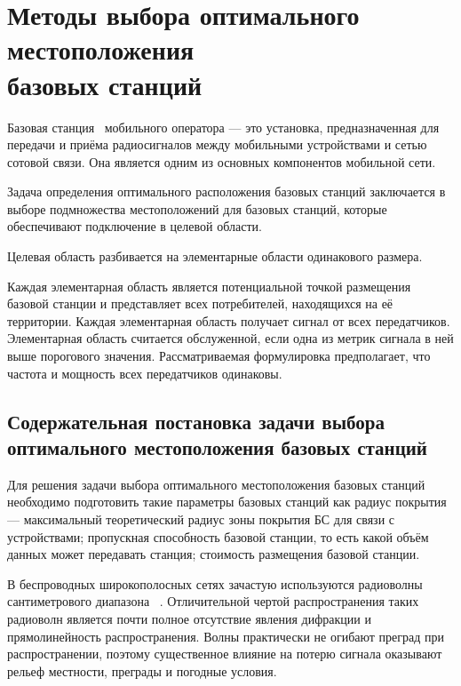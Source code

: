 
\chapter[Методы выбора оптимального местоположения базовых \\станций]{Методы выбора оптимального местоположения \\базовых станций}

Базовая станция~\cite{def-bs} мобильного оператора --- это установка, предназначенная для передачи и приёма радиосигналов между мобильными устройствами и сетью сотовой связи. Она является одним из основных компонентов мобильной сети.

Задача определения оптимального расположения базовых станций заключается в выборе подмножества местоположений для базовых станций, которые обеспечивают подключение в целевой области. 

Целевая область разбивается на элементарные области одинакового размера.

Каждая элементарная область является потенциальной точкой размещения базовой станции и представляет всех потребителей, находящихся на её территории. Каждая элементарная область получает сигнал от всех передатчиков. Элементарная область считается обслуженной, если одна из метрик сигнала в ней выше порогового значения. Рассматриваемая формулировка предполагает, что частота и мощность всех передатчиков одинаковы. 


\section[Содержательная постановка задачи выбора оптимального\\ местоположения базовых станций]{Содержательная постановка задачи выбора\\ оптимального местоположения базовых станций}

Для решения задачи выбора оптимального местоположения базовых станций необходимо подготовить такие параметры базовых станций как радиус покрытия --- максимальный теоретический радиус зоны покрытия БС для связи с устройствами; пропускная способность базовой станции, то есть какой объём данных может передавать станция; стоимость размещения базовой станции.

В беспроводных широкополосных сетях зачастую используются радиоволны сантиметрового диапазона ~\cite{wave-len}. Отличительной чертой распространения таких радиоволн является почти полное отсутствие явления дифракции и прямолинейность распространения. Волны практически не огибают преград при распространении, поэтому существенное влияние на потерю сигнала оказывают рельеф местности, преграды и погодные условия.

